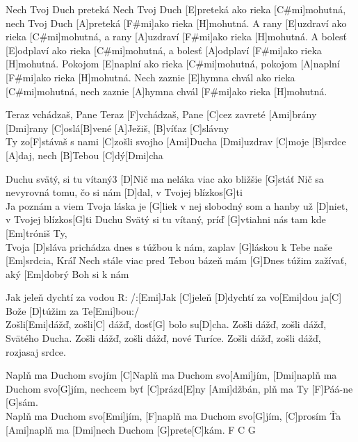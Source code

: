 \documentclass[12pt]{article}
\begin{document}
\begin{songgroup}{2}
	\begin{groupitem}{Nech Tvoj Duch preteká}
		Nech Tvoj Duch [E]preteká ako rieka [C#mi]mohutná,
		nech Tvoj Duch [A]preteká [F#mi]ako rieka [H]mohutná.
		A rany [E]uzdraví ako rieka [C#mi]mohutná,
		a rany [A]uzdraví [F#mi]ako rieka [H]mohutná.
		A bolesť [E]odplaví ako rieka [C#mi]mohutná,
		a bolesť [A]odplaví [F#mi]ako rieka [H]mohutná.
		Pokojom [E]naplní ako rieka [C#mi]mohutná,
		pokojom [A]naplní [F#mi]ako rieka [H]mohutná.
		Nech zaznie [E]hymna chvál ako rieka 
		[C#mi]mohutná,
		nech zaznie [A]hymna chvál [F#mi]ako rieka 
		[H]mohutná.
	\end{groupitem}
	\columnbreak
	\begin{groupitem}{Teraz vchádzaš, Pane}
		Teraz [F]vchádzaš, Pane
		[C]cez zavreté [Ami]brány
		[Dmi]rany [C]oslá[B]vené
		[A]Ježiš, [B]víťaz [C]slávny
		\\
		Ty zo[F]stávaš s nami
		[C]zošli svojho [Ami]Ducha
		[Dmi]uzdrav [C]moje [B]srdce
		[A]daj, nech [B]Tebou [C]dý[Dmi]cha
	\end{groupitem}
\end{songgroup}

\begin{song}{Duchu svätý, si tu vítaný}{3}
	[D]Nič ma neláka viac
	ako bližšie [G]stáť
	Nič sa nevyrovná
	tomu, čo si nám [D]dal,
	v Tvojej blízkos[G]ti
	\\
	[D]Ja poznám a viem
	Tvoja láska je [G]liek
	v nej slobodný som
	a hanby už [D]niet,
	v Tvojej blízkos[G]ti
	\columnbreak
	[D]Duchu Svätý si tu vítaný,
	príď [G]vtiahni nás
	tam kde [Em]tróniš Ty,
	\\
	Tvoja [D]sláva prichádza dnes
	s túžbou k nám,
	zaplav [G]láskou k Tebe
	naše [Em]srdcia, Kráľ
	\columnbreak
	[D]Nech stále viac pred Tebou
	bázeň mám
	[G]Dnes túžim zažívať,
	aký [Em]dobrý Boh si k nám
\end{song}

\begin{songgroup}{2}
	\begin{groupitem}{Jak jeleň dychtí za vodou}	
		R: /:[Emi]Jak [C]jeleň [D]dychtí za vo[Emi]dou
		ja[C] Bože [D]túžim za Te[Emi]bou:/
		\\
		Zošli[Emi]dážď, zošli[C] dážď, dosť[G] bolo su[D]cha.
		Zošli dážď, zošli dážď, Svätého Ducha.
		Zošli dážď, zošli dážď, nové Turíce.
		Zošli dážď, zošli dážď, rozjasaj srdce.
	\end{groupitem}
	\columnbreak
	\begin{groupitem}{Naplň ma Duchom svojím}
		[C]Naplň ma Duchom svo[Ami]jím, 
		[Dmi]naplň ma Duchom svo[G]jím,
		nechcem byť [C]prázd[E]ny [Ami]džbán, 
		plň ma Ty [F]Páá-ne [G]sám.
		\\
		[Ami]Naplň ma Duchom svo[Emi]jím, 
		[F]naplň ma Duchom svo[G]jím,
		[C]prosím Ťa [Ami]naplň ma 
		[Dmi]nech Duchom [G]prete[C]kám. F C G
	\end{groupitem}
\end{songgroup}
\end{document}
